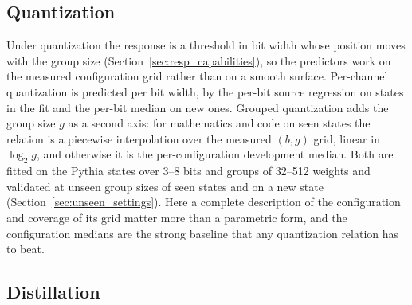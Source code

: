 \subsection{Quantization}
\label{sec:law_quant}

Under quantization the response is a threshold in bit width whose position moves with the group size
(Section~\ref{sec:resp_capabilities}), so the predictors work on the measured configuration grid
rather than on a smooth surface. Per-channel quantization is predicted per bit width, by the per-bit
source regression on states in the fit and the per-bit median on new ones. Grouped quantization adds
the group size $g$ as a second axis: for mathematics and code on seen states the relation is a
piecewise interpolation over the measured $(b,g)$ grid, linear in $\log_2 g$, and otherwise it is the
per-configuration development median. Both are fitted on the Pythia states over 3--8 bits and groups
of 32--512 weights and validated at unseen group sizes of seen states and on a new state
(Section~\ref{sec:unseen_settings}). Here a complete description of the
configuration and coverage of its grid matter more than a parametric form, and the configuration
medians are the strong baseline that any quantization relation has to beat. 

\subsection{Distillation}
\label{sec:law_distill}

